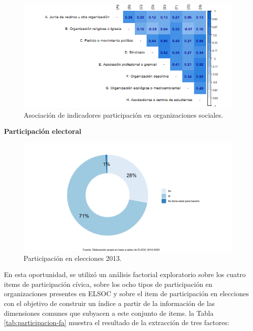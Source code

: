 \documentclass[
  12pt,
]{book}
\begin{document}
\begin{figure}[H]

{\centering \includegraphics[width=1\linewidth,height=1\textheight]{output/graphs/participacion-organizaciones_cor} 

}

\caption{Asociación de indicadores participación en organizaciones sociales.}\label{fig:participacion-organizaciones-cor}
\end{figure}

\textbf{Participación electoral}

\begin{figure}[H]

{\centering \includegraphics[width=1\linewidth,height=1\textheight]{output/graphs/participacion-electoral} 

}

\caption{Participación en elecciones 2013.}\label{fig:participacion-electoral}
\end{figure}

En esta oportunidad, se utilizó un análisis factorial exploratorio sobre los cuatro items de participación cívica, sobre los ocho tipos de participación en organizaciones presentes en ELSOC y sobre el item de participación en elecciones con el objetivo de construir un índice a partir de la información de las dimensiones comunes que subyacen a este conjunto de items. la Tabla \ref{tab:participacion-fa} muestra el resultado de la extracción de tres factores:
\end{document}
